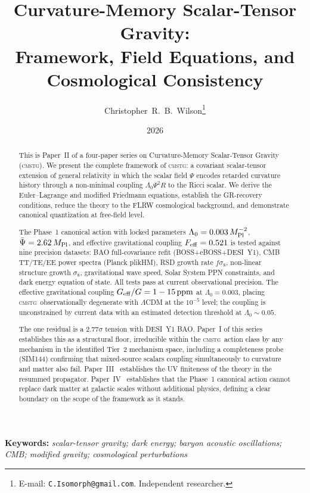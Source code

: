 \documentclass[12pt,a4paper]{article}
\title{\textbf{Curvature-Memory Scalar-Tensor Gravity:\\
       Framework, Field Equations, and Cosmological Consistency}}
\author{Christopher~R.~B.~Wilson\thanks{E-mail: \texttt{C.Isomorph@gmail.com}. Independent researcher.}}
\date{2026}
\newcommand{\CMSTG}{\textsc{cmstg}}
\newcommand{\Psibar}{\bar\Psi}
\newcommand{\Feff}{F_{\rm eff}}
\newcommand{\Geff}{G_{\rm eff}}
\newcommand{\Lz}{\Lambda_0}
\newcommand{\Mpl}{M_{\rm Pl}}
\newcommand{\keywords}[1]{\par\noindent\textbf{Keywords:} \textit{#1}\par\bigskip}
\begin{document}
\maketitle

\begin{abstract}
This is Paper~II of a four-paper series on Curvature-Memory Scalar-Tensor
Gravity (\CMSTG). We present the complete framework of \CMSTG: a covariant
scalar-tensor extension of general relativity in which the scalar field $\Psi$
encodes retarded curvature history through a non-minimal coupling $\Lz\Psi^2 R$
to the Ricci scalar. We derive the Euler--Lagrange and modified Friedmann
equations, establish the GR-recovery conditions, reduce the theory to the FLRW
cosmological background, and demonstrate canonical quantization at free-field level.

The Phase~1 canonical action with locked parameters $\Lz = 0.003\,\Mpl^{-2}$,
$\Psibar = 2.62\,\Mpl$, and effective gravitational coupling $\Feff = 0.521$ is
tested against nine precision datasets: BAO full-covariance refit
(BOSS+eBOSS+DESI~Y1), CMB TT/TE/EE power spectra (Planck plikHM), RSD growth
rate $f\sigma_8$, non-linear structure growth $\sigma_8$, gravitational wave
speed, Solar System PPN constraints, and dark energy equation of state. All
tests pass at current observational precision. The effective gravitational
coupling $\Geff/G = 1 - 15\,\mathrm{ppm}$ at $\Lz = 0.003$, placing \CMSTG\
observationally degenerate with $\Lambda$CDM at the $10^{-5}$ level; the
coupling is unconstrained by current data with an estimated detection threshold
at $\Lz \sim 0.05$.

The one residual is a $2.77\sigma$ tension with DESI~Y1 BAO. Paper~I of this
series~\cite{WilsonPaperI} establishes this as a structural floor, irreducible
within the \CMSTG\ action class by any mechanism in the identified Tier~2
mechanism space, including a completeness probe (SIM144) confirming that
mixed-source scalars coupling simultaneously to curvature and matter also fail. Paper~III~\cite{WilsonPaperIII} establishes the UV finiteness
of the theory in the resummed propagator. Paper~IV~\cite{WilsonPaperIV}
establishes that the Phase~1 canonical action cannot replace dark matter at
galactic scales without additional physics, defining a clear boundary on the
scope of the framework as it stands.
\end{abstract}

\keywords{scalar-tensor gravity; dark energy; baryon acoustic oscillations; CMB; modified gravity; cosmological perturbations}
\end{document}
